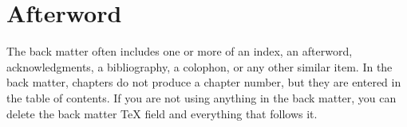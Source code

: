 \documentclass[letterpaper,12pt,openany,reqno]{book}%
\begin{document}
\backmatter

\chapter{Afterword}

The back matter often includes one or more of an index, an afterword,
acknowledgments, a bibliography, a colophon, or any other similar item. In
the back matter, chapters do not produce a chapter number, but they are
entered in the table of contents. If you are not using anything in the back
matter, you can delete the back matter TeX field and everything that follows it.
\end{document}
